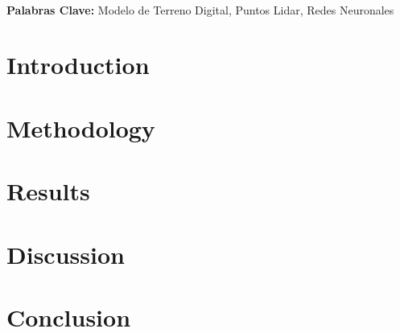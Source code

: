 \documentclass[11pt, a4paper]{tesis}
\title{\Large\bfseries{\titulo}}
\author{\autor}
\date{\fecha}
\begin{document}
\maketitle

 \\
\vspace{0.4cm}
\noindent \textbf{Palabras Clave:} Modelo de Terreno Digital, Puntos Lidar, Redes Neuronales


\clearpage
\twocolumn
\section{Introduction}


\section{Methodology}


\section{Results}


\section{Discussion}


\section{Conclusion}

\end{document}
